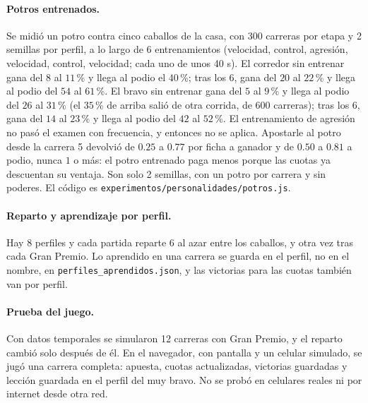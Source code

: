 \documentclass[11pt,letterpaper]{article}
\begin{document}
\paragraph{Potros entrenados.} Se midió un potro contra cinco caballos de la casa, con 300 carreras por etapa y 2 semillas por perfil, a lo largo de 6 entrenamientos (velocidad, control, agresión, velocidad, control, velocidad; cada uno de unos 40 s). El corredor sin entrenar gana del $8$ al $11$\,\% y llega al podio el $40$\,\%; tras los 6, gana del $20$ al $22$\,\% y llega al podio del $54$ al $61$\,\%. El bravo sin entrenar gana del $5$ al $9$\,\% y llega al podio del $26$ al $31$\,\% (el $35$\,\% de arriba salió de otra corrida, de 600 carreras); tras los 6, gana del $14$ al $23$\,\% y llega al podio del $42$ al $52$\,\%. El entrenamiento de agresión no pasó el examen con frecuencia, y entonces no se aplica. Apostarle al potro desde la carrera 5 devolvió de $0.25$ a $0.77$ por ficha a ganador y de $0.50$ a $0.81$ a podio, nunca $1$ o más: el potro entrenado paga menos porque las cuotas ya descuentan su ventaja. Son solo 2 semillas, con un potro por carrera y sin poderes. El código es \texttt{experimentos/personalidades/potros.js}.

\paragraph{Reparto y aprendizaje por perfil.} Hay 8 perfiles y cada partida reparte 6 al azar entre los caballos, y otra vez tras cada Gran Premio. Lo aprendido en una carrera se guarda en el perfil, no en el nombre, en \texttt{perfiles\_aprendidos.json}, y las victorias para las cuotas también van por perfil.

\paragraph{Prueba del juego.} Con datos temporales se simularon 12 carreras con Gran Premio, y el reparto cambió solo después de él. En el navegador, con pantalla y un celular simulado, se jugó una carrera completa: apuesta, cuotas actualizadas, victorias guardadas y lección guardada en el perfil del muy bravo. No se probó en celulares reales ni por internet desde otra red.
\end{document}
